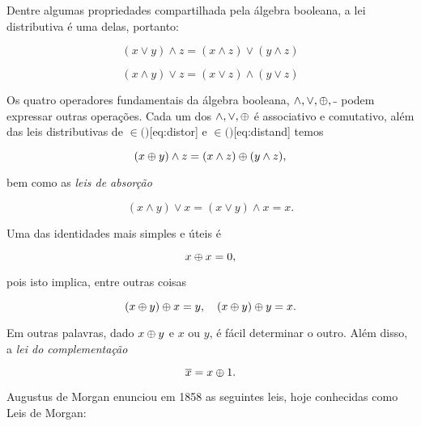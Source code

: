 Dentre algumas propriedades compartilhada pela álgebra booleana, a lei
distributiva é uma delas, portanto:


\begin{equation}
   (x\lor y) \land z = (x\land z)\lor (y\land z)
   \label{eq:distor}
\end{equation}

\begin{equation}
  (x\land y) \lor z = (x\lor z)\land (y\lor z)
  \label{eq:distand}
\end{equation}



 Os quatro operadores fundamentais da
álgebra booleana, $\land, \lor, \oplus, \overline{\ }$ podem expressar
outras operações. Cada um dos $\land, \lor, \oplus$ é associativo e
comutativo, além das leis distributivas de $\in{(}{)}$[eq:distor] e
$\in{(}{)}$[eq:distand] temos

\begin{equation}
  (x\oplus y) \land z = (x\land z) \oplus (y \land z),
\label{eq:distributive}
\end{equation}

\noindent bem como as {\em leis de absorção}

\begin{equation}
  (x\land y) \lor x = (x\lor y) \land x = x.
  \label{eq:xor:absorption}
\end{equation}

\noindent Uma das identidades mais simples e úteis é

\begin{equation}
x \oplus x = 0,
  \label{eq:xor:identity}
\end{equation}

\noindent pois isto implica, entre outras coisas

\begin{equation}
  (x\oplus y) \oplus x = y, \quad (x\oplus y) \oplus y = x.
  \label{eq:xor:absorption2}
\end{equation}

Em outras palavras, dado $x\oplus y$ e $x$ ou $y$, é fácil determinar o
outro. Além disso, a {\em lei do complementação}

\begin{equation}
  \overline{x} =  x \oplus  1.
  \label{eq:complementation}
\end{equation}


 Augustus de Morgan enunciou em 1858 as
seguintes leis, hoje conhecidas como Leis de Morgan:


